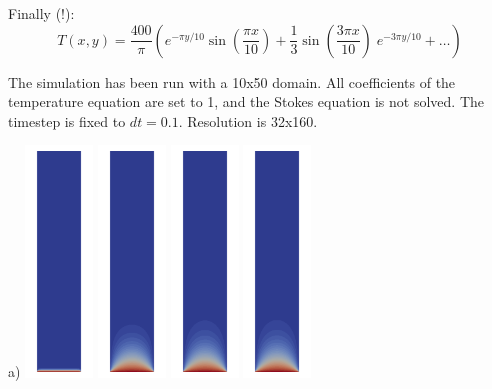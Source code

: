 Finally (!):
\[
T(x,y) = 
\frac{400}{\pi}
\left(
e^{-\pi y/10} \sin (\frac{\pi x}{10})
+\frac{1}{3}
\sin (\frac{3\pi x}{10}) \;   e^{-3\pi y/10}
+ \dots
\right)
\]

The simulation has been run with a 10x50 domain. All coefficients of the temperature equation are
set to 1, and the Stokes equation is not solved. The timestep is fixed to $dt=0.1$. Resolution 
is 32x160. 

\begin{center}
a)
\includegraphics[width=1.8cm]{images/benchmark_lapplate/temper0000.png}
\includegraphics[width=1.8cm]{images/benchmark_lapplate/temper0010.png}
\includegraphics[width=1.8cm]{images/benchmark_lapplate/temper0020.png}
\includegraphics[width=1.8cm]{images/benchmark_lapplate/temper0030.png}

\end{center}
